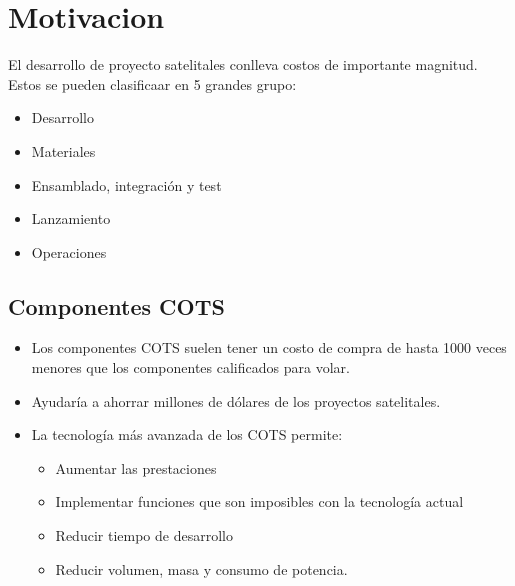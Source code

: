 \section{Motivacion}
\begin{frame}
	El desarrollo de proyecto satelitales conlleva costos de importante magnitud. Estos se pueden clasificaar en 5 grandes grupo:
	\begin{itemize}
		\item Desarrollo
		\item Materiales
		\item Ensamblado, integración y test
		\item Lanzamiento
		\item Operaciones
	\end{itemize}
\end{frame}

\subsection{Componentes COTS}
\begin{frame}
	\begin{itemize}
		\item Los componentes COTS suelen tener un costo de compra  de hasta 1000 veces menores que los componentes calificados para volar.
		\item Ayudaría a ahorrar millones de dólares de los proyectos satelitales. 
		\item La tecnología más avanzada de los COTS permite:
		\begin{itemize}
			\item Aumentar las prestaciones
			\item Implementar funciones que son imposibles con la tecnología actual
			\item Reducir tiempo de desarrollo
			\item Reducir volumen, masa y consumo de potencia.
		\end{itemize}
	\end{itemize}



	

	
	
\end{frame}